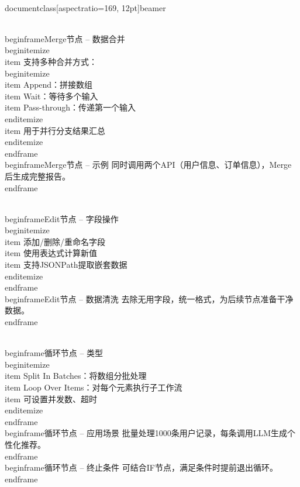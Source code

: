 \\documentclass[aspectratio=169, 12pt]{beamer}
\begin{document}
\\begin{frame}{Merge节点 – 数据合并}
\\begin{itemize}
\\item 支持多种合并方式：
\\begin{itemize}
\\item Append：拼接数组
\\item Wait：等待多个输入
\\item Pass-through：传递第一个输入
\\end{itemize}
\\item 用于并行分支结果汇总
\\end{itemize}
\\end{frame}
\\begin{frame}{Merge节点 – 示例}
同时调用两个API（用户信息、订单信息），Merge后生成完整报告。
\\end{frame}

\\begin{frame}{Edit节点 – 字段操作}
\\begin{itemize}
\\item 添加/删除/重命名字段
\\item 使用表达式计算新值
\\item 支持JSONPath提取嵌套数据
\\end{itemize}
\\end{frame}
\\begin{frame}{Edit节点 – 数据清洗}
去除无用字段，统一格式，为后续节点准备干净数据。
\\end{frame}

\\begin{frame}{循环节点 – 类型}
\\begin{itemize}
\\item Split In Batches：将数组分批处理
\\item Loop Over Items：对每个元素执行子工作流
\\item 可设置并发数、超时
\\end{itemize}
\\end{frame}
\\begin{frame}{循环节点 – 应用场景}
批量处理1000条用户记录，每条调用LLM生成个性化推荐。
\\end{frame}
\\begin{frame}{循环节点 – 终止条件}
可结合IF节点，满足条件时提前退出循环。
\\end{frame}
\end{document}

